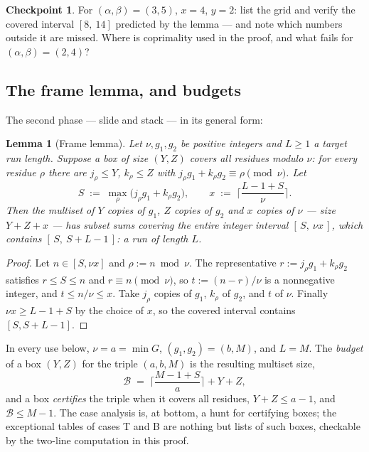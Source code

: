 \documentclass[11pt,reqno]{amsart}
\theoremstyle{plain}
\newtheorem{lemma}[theorem]{Lemma}
\theoremstyle{definition}
\newtheorem{checkpoint}[theorem]{Checkpoint}   %
\theoremstyle{remark}
\begin{document}
\begin{checkpoint}
For $(\alpha, \beta) = (3, 5)$, $x = 4$, $y = 2$: list the grid and verify the
covered interval $[8,\ 14]$ predicted by the lemma --- and note which numbers
outside it are missed. Where is coprimality used in the proof, and what fails for
$(\alpha, \beta) = (2, 4)$?
\end{checkpoint}

\subsection{The frame lemma, and budgets}

The second phase --- slide and stack --- in its general form:

\begin{lemma}[Frame lemma]\label{lem:frame-friendly}
Let $\nu, g_1, g_2$ be positive integers and $L \ge 1$ a target run length. Suppose
a \emph{box} of size $(Y, Z)$ covers all residues modulo $\nu$: for every residue
$\rho$ there are $j_\rho \le Y$, $k_\rho \le Z$ with $j_\rho g_1 + k_\rho g_2
\equiv \rho \pmod \nu$. Let
\[
  S \;:=\; \max_\rho \big( j_\rho g_1 + k_\rho g_2 \big),
  \qquad
  x \;:=\; \Big\lceil \frac{L - 1 + S}{\nu} \Big\rceil .
\]
Then the multiset of $Y$ copies of $g_1$, $Z$ copies of $g_2$ and $x$ copies of
$\nu$ --- size $Y + Z + x$ --- has subset sums covering the entire integer interval
$[\,S,\ \nu x\,]$, which contains $[\,S,\ S + L - 1\,]$: a run of length $L$.
\end{lemma}

\begin{proof}
Let $n \in [S, \nu x]$ and $\rho := n \bmod \nu$. The representative $r := j_\rho
g_1 + k_\rho g_2$ satisfies $r \le S \le n$ and $r \equiv n \pmod \nu$, so $t :=
(n - r)/\nu$ is a nonnegative integer, and $t \le n/\nu \le x$. Take $j_\rho$
copies of $g_1$, $k_\rho$ of $g_2$, and $t$ of $\nu$. Finally $\nu x \ge L - 1 + S$
by the choice of $x$, so the covered interval contains $[S, S + L - 1]$.
\end{proof}

In every use below, $\nu = a = \min G$, $(g_1, g_2) = (b, M)$, and $L = M$. The
\emph{budget} of a box $(Y, Z)$ for the triple $(a, b, M)$ is the resulting
multiset size,
\[
  \mathcal{B} \;=\; \Big\lceil \frac{M - 1 + S}{a} \Big\rceil + Y + Z ,
\]
and a box \emph{certifies} the triple when it covers all residues, $Y + Z \le a -
1$, and $\mathcal{B} \le M - 1$. The case analysis is, at bottom, a hunt for
certifying boxes; the exceptional tables of cases T and B are nothing but lists of
such boxes, checkable by the two-line computation in this proof.
\end{document}
